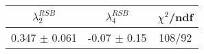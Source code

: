 \begin{tabular}{c|c||c}
$\lambda_{2}^{RSB}$ & $\lambda_4^{RSB}$ & $\chi^{2}$/ndf \\
\hline
0.347 $\pm$ 0.061 & -0.07 $\pm$ 0.15 & 108/92\\
\end{tabular}
